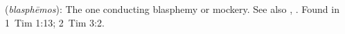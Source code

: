 \item[Blasphemous,]

(\textit{blasphēmos}):
The one conducting blasphemy or mockery. See also , .
Found in 1~Tim 1:13; 2~Tim 3:2.
